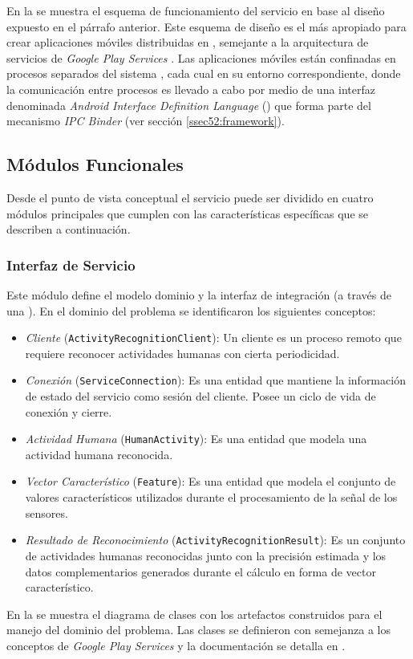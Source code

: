 En la  se muestra el esquema de funcionamiento
del servicio \emph{} en base al diseño expuesto en
el párrafo anterior. Este esquema de diseño es el más apropiado para
crear aplicaciones móviles distribuidas en \emph{},
semejante a la arquitectura de servicios de \emph{Google Play Services}
\cite{Google2016l}. Las aplicaciones móviles están confinadas en
procesos separados del sistema \emph{}, cada cual en
su entorno  correspondiente, donde la comunicación entre
procesos es llevado a cabo por medio de una interfaz denominada \emph{Android
Interface Definition Language} () que forma parte del
mecanismo \emph{IPC Binder} (ver sección \ref{ssec52:framework}).

\subsection{Módulos Funcionales}

\label{ssec54:modulos}Desde el punto de vista conceptual el servicio
\emph{} puede ser dividido en cuatro módulos principales
que cumplen con las características específicas que se describen a
continuación.

\subsubsection{Interfaz de Servicio}

Este módulo define el modelo dominio y la interfaz de integración
(a través de una ). En el dominio del problema se identificaron
los siguientes conceptos:
\begin{itemize}
\item \emph{Cliente} (\texttt{\small{}ActivityRecognitionClient}): Un cliente
es un proceso remoto que requiere reconocer actividades humanas con
cierta periodicidad.
\item \emph{Conexión} (\texttt{\small{}ServiceConnection}):\emph{ }Es una
entidad que mantiene la información de estado del servicio como sesión
del cliente. Posee un ciclo de vida de conexión y cierre.
\item \emph{Actividad Humana} (\texttt{\small{}HumanActivity}): Es una entidad
que modela una actividad humana reconocida.
\item \emph{Vector Característico} (\texttt{\small{}Feature}): Es una entidad
que modela el conjunto de valores característicos utilizados durante
el procesamiento de la señal de los sensores.
\item \emph{Resultado de Reconocimiento} (\texttt{\small{}ActivityRecognitionResult}):
Es un conjunto de actividades humanas reconocidas junto con la precisión
estimada y los datos complementarios generados durante el cálculo
en forma de vector característico.
\end{itemize}
En la  se muestra el diagrama de clases
con los artefactos construidos para el manejo del dominio del problema.
Las clases se definieron con semejanza a los conceptos de \emph{Google
Play Services} \cite{Google2016l} y la documentación se detalla en
\cite{GimenezYegros2016d}.

